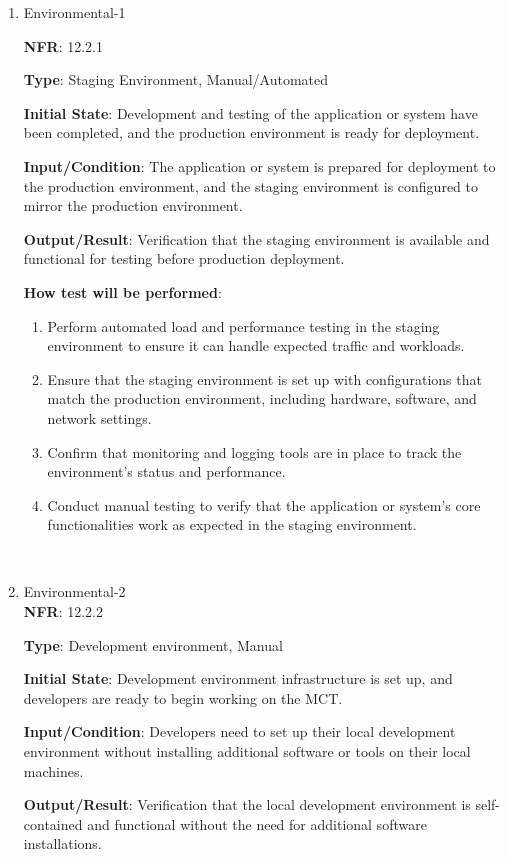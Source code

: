 \documentclass[12pt, titlepage]{article}
\begin{document}
\begin{enumerate}

\item{Environmental-1\\}

\textbf{NFR}: 12.2.1

\textbf{Type}: Staging Environment, Manual/Automated

\textbf{Initial State}: Development and testing of the application or system have been completed, and the production environment is ready for deployment.

\textbf{Input/Condition}: The application or system is prepared for deployment to the production environment, and the staging environment is configured to mirror the production environment.

\textbf{Output/Result}: Verification that the staging environment is available and functional for testing before production deployment.

\textbf{How test will be performed}: 
\begin{enumerate}
    \item Perform automated load and performance testing in the staging environment to ensure it can handle expected traffic and workloads.
    \item Ensure that the staging environment is set up with configurations that match the production environment, including hardware, software, and network settings.
    \item Confirm that monitoring and logging tools are in place to track the environment's status and performance.
    \item Conduct manual testing to verify that the application or system's core functionalities work as expected in the staging environment.
\end{enumerate}
\\
 
					
\item{Environmental-2 \\}
\textbf{NFR}: 12.2.2

\textbf{Type}: Development environment, Manual

\textbf{Initial State}: Development environment infrastructure is set up, and developers are ready to begin working on the MCT.

\textbf{Input/Condition}: Developers need to set up their local development environment without installing additional software or tools on their local machines.

\textbf{Output/Result}: Verification that the local development environment is self-contained and functional without the need for additional software installations.


\end{enumerate}
\end{document}
